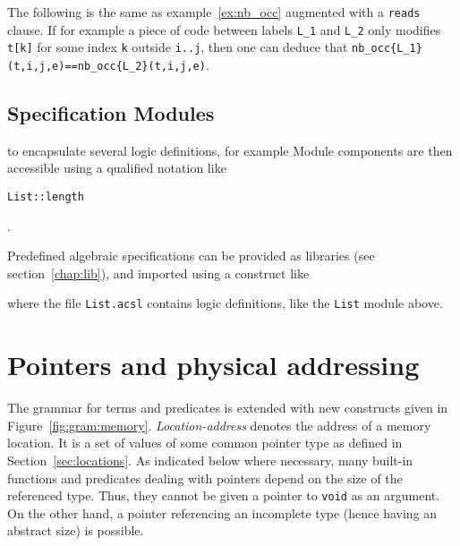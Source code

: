 \begin{example}
  The following is the same as example~\ref{ex:nb_occ} augmented with
  a \lstinline|reads| clause.
  If for example a
  piece of code between labels \lstinline|L_1| and \lstinline|L_2|
  only modifies \lstinline|t[k]| for
  some index \lstinline|k| outside \lstinline|i..j|, then one can deduce that
  \lstinline|nb_occ{L_1}(t,i,j,e)==nb_occ{L_2}(t,i,j,e)|.
\end{example}

\subsection{Specification Modules}
\label{sec:specmodules}

\experimental

 to encapsulate
several logic definitions, for example
Module components are then accessible using a qualified notation like
\begin{notimplementedenv}\lstinline|List::length|\end{notimplementedenv}.

Predefined algebraic specifications can be provided as
libraries (see
section~\ref{chap:lib}), and imported using a construct like
\begin{notimplementedenv}
\end{notimplementedenv}
where the file \lstinline|List.acsl| contains logic
definitions, like the \lstinline|List| module above.



\section{Pointers and physical addressing}
\label{sec:pointers} 
The grammar for terms and predicates is
extended with new constructs given in Figure~\ref{fig:gram:memory}. 
\textsl{Location-address} denotes the address of a memory location. 
It is a set of values of some common pointer type as defined in Section~\ref{sec:locations}. As indicated below where necessary,
many built-in functions and predicates dealing with
pointers depend on the size of the referenced type. Thus, they cannot be given
a pointer to \lstinline|void| as an argument. On the
other hand, a pointer referencing an incomplete type (hence having an
abstract size) is possible.

